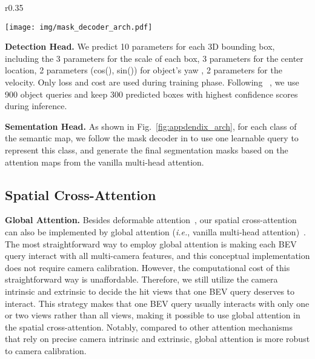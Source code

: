 \documentclass{article}
\def\ie{\emph{i.e.}}
\begin{document}
\begin{wrapfigure}{r}{0.35\linewidth}
    \vspace{-35px}
\renewcommand{\captionlabelfont}{\scriptsize}
    \begin{center}
    \texttt{[image: img/mask\_decoder\_arch.pdf]}
    \caption{\scriptsize \textbf{
Segmentation head (mask decoder) of BEVFormer.
    }}
    \label{fig:appdendix_arch}
    \end{center}
    \vspace{-40px}
\end{wrapfigure}
\textbf{Detection Head.} We predict 
10 parameters for each 3D bounding box, 
including the 3 parameters   for the scale of each box, 3 parameters  for the center location, 2 parameters  (cos(), sin()) for object's yaw , 2 parameters  for the  velocity. Only  loss and  cost are used during training phase. Following ~\cite{wang2022detr3d}, we use 900 object queries and keep 300 predicted boxes with highest confidence scores during inference.

\noindent\textbf{Sementation Head.} 
As shown in Fig.~\ref{fig:appdendix_arch}, for each class of the semantic map, we follow the mask decoder in \cite{li2021panoptic} to use one learnable query to represent this class, and generate the final segmentation masks based on the attention maps from the vanilla multi-head attention.

\subsection{Spatial Cross-Attention}

\noindent\textbf{Global Attention.} Besides deformable attention~\cite{zhu2020deformable}, our spatial cross-attention can also be implemented by global attention (\ie,  vanilla multi-head attention)~\cite{vaswani2017attention}. The most straightforward way to employ global attention is making each BEV query interact with all multi-camera features, and this conceptual implementation does not require camera calibration.
However, the computational cost of this straightforward way is unaffordable. Therefore, we still utilize the camera intrinsic and extrinsic to decide the hit views that one BEV query deserves to interact. This strategy makes that one BEV query usually interacts with only one or two views rather than all views, making it possible to use global attention in the spatial cross-attention. Notably, compared to other attention mechanisms that rely on precise camera intrinsic and extrinsic, global attention is more robust to camera calibration.
\end{document}
